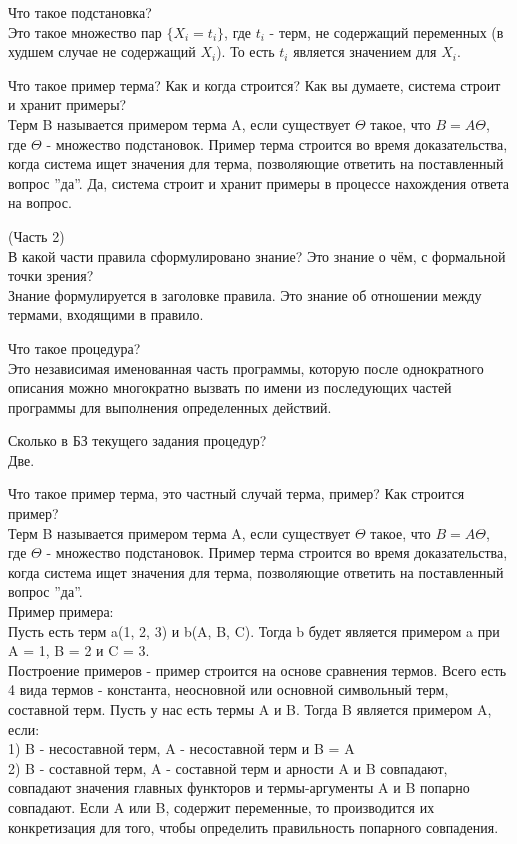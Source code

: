 Что такое подстановка?\\
Это такое множество пар $\{X_i = t_i\}$, где $t_i$ - терм, не содержащий переменных (в худшем случае не содержащий $X_i$). То есть $t_i$ является значением для $X_i$.

Что такое пример терма? Как и когда строится? Как вы думаете, система строит и хранит примеры?\\
Терм B называется примером терма A, если существует $\Theta$ такое, что $B = A\Theta$, где $\Theta$ - множество подстановок. Пример терма строится во время доказательства, когда система ищет значения для терма, позволяющие ответить на поставленный вопрос ''да''. Да, система строит и хранит примеры в процессе нахождения ответа на вопрос.

(Часть 2)\\
В какой части правила сформулировано знание? Это знание о чём, с формальной точки зрения?\\
Знание формулируется в заголовке правила. Это знание об отношении между термами, входящими в правило.

Что такое процедура?\\
Это независимая именованная часть программы, которую после однократного описания можно многократно вызвать по имени из последующих частей программы для выполнения определенных действий.

Сколько в БЗ текущего задания процедур?\\
Две.

Что такое пример терма, это частный случай терма, пример? Как строится пример?\\
Терм B называется примером терма A, если существует $\Theta$ такое, что $B = A\Theta$, где $\Theta$ - множество подстановок. Пример терма строится во время доказательства, когда система ищет значения для терма, позволяющие ответить на поставленный вопрос ''да''.\\

Пример примера:\\
Пусть есть терм a(1, 2, 3) и b(A, B, C). Тогда b будет является примером a при A = 1, B = 2 и C = 3.\\

Построение примеров - пример строится на основе сравнения термов. Всего есть 4 вида термов - константа, неосновной или основной символьный терм, составной терм. Пусть у нас есть термы A и B. Тогда B является примером A, если:\\
1) B - несоставной терм, A - несоставной терм и B = A\\
2) B - составной терм, A - составной терм и арности A и B совпадают, совпадают значения главных функторов и термы-аргументы A и B попарно совпадают. Если A или B, содержит переменные, то производится их конкретизация для того, чтобы определить правильность попарного совпадения.

